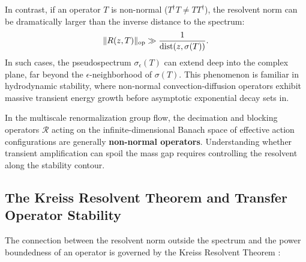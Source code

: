 In contrast, if an operator $T$ is non-normal ($T^\dagger T \neq T T^\dagger$), the resolvent norm can be dramatically larger than the inverse distance to the spectrum:
\begin{equation}
\label{eq:non_normal_discrepancy}
\|R(z, T)\|_{\mathrm{op}} \gg \frac{1}{\mathrm{dist}(z, \sigma(T))}.
\end{equation}
In such cases, the pseudospectrum $\sigma_\epsilon(T)$ can extend deep into the complex plane, far beyond the $\epsilon$-neighborhood of $\sigma(T)$. This phenomenon is familiar in hydrodynamic stability, where non-normal convection-diffusion operators exhibit massive transient energy growth before asymptotic exponential decay sets in.

In the multiscale renormalization group flow, the decimation and blocking operators $\mathcal{R}$ acting on the infinite-dimensional Banach space of effective action configurations are generally \textbf{non-normal operators}. Understanding whether transient amplification can spoil the mass gap requires controlling the resolvent along the stability contour.

\subsection{The Kreiss Resolvent Theorem and Transfer Operator Stability}
\label{subsec:kreiss_theorem}

The connection between the resolvent norm outside the spectrum and the power boundedness of an operator is governed by the Kreiss Resolvent Theorem \cite{TrefethenEmbree2005}:

